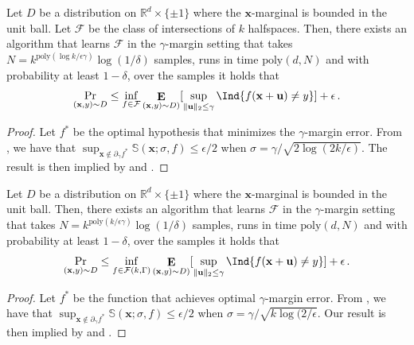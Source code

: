 \documentclass{theoretics}
\newcommand\twonorm[1]{\|#1\|_2}
\renewcommand\vec[1]{\mathbf{#1}}
\DeclareMathOperator*{\E}{\mathbf{E}}
\newcommand{\R}{\mathbb{R}}
\newcommand{\poly}{\mathrm{poly}}
\newcommand{\1}{\Ind}
\newcommand{\x}{\vec x}
\newcommand{\vu}{\vec u}
\newcommand{\F}{\mathcal{F}}
\begin{document}
\begin{theorem}
    Let $D$ be a distribution on $\R^{d}\times \{\pm 1\}$ where the $\x$-marginal is bounded in the unit ball. Let $\F$ be the class of intersections of $k$ halfspaces. Then, there exists an algorithm that learns $\F$ in the $\gamma$-margin setting that takes $N=k^{\poly(\log k/\epsilon\gamma)}\log(1/\delta)$ samples, runs in time $\poly(d,N)$ and with probability at least $1-\delta$, over the samples it holds that
    \[
    \Pr_{(\x,y)\sim D}\leq \inf_{f\in \F}\E_{(\x,y)\sim D)}[\sup_{\twonorm{\vu}\leq \gamma}\1\{f(\x+\vu)\neq y\}]+\epsilon\,.
    \]
\end{theorem}
\begin{proof}
    Let $f^*$ be the optimal hypothesis that minimizes the $\gamma$-margin error. From ,  we have that $\sup_{\x\notin \partial_{\gamma}f^*}\mathbb{S}(\x;\sigma,f)\leq \epsilon/2$ when $\sigma=\gamma/\sqrt{2\log(2k/\epsilon)}$.  The result is then implied by  and .
\end{proof}
\begin{theorem}[Learning $\F(k,\Gamma)$ with $\gamma$-margin]
    Let $D$ be a distribution on $\R^{d}\times \{\pm 1\}$ where the $\x$-marginal is bounded in the unit ball. Then, there exists an algorithm that learns $\F$ in the $\gamma$-margin setting that takes $N=k^{\poly(k/\epsilon\gamma)}\log(1/\delta)$ samples, runs in time $\poly(d,N)$ and with probability at least $1-\delta$, over the samples it holds that
    \[
    \Pr_{(\x,y)\sim D}\leq \inf_{f\in \F(k,\Gamma)}\E_{(\x,y)\sim D)}[\sup_{\twonorm{\vu}\leq \gamma}\1\{f(\x+\vu)\neq y\}]+\epsilon\,.
    \]
\end{theorem}
\begin{proof}
Let $f^*$ be the function that achieves optimal $\gamma$-margin error. From , we have that $\sup_{\x\notin\partial_{\gamma}f^*}\mathbb{S}(\x;\sigma,f)\leq \epsilon/2$ when $\sigma=\gamma/\sqrt{k\log(2/\epsilon}$. Our result is then implied by  and . 
\end{proof}
\renewcommand{\arraystretch}{2}
\end{document}
